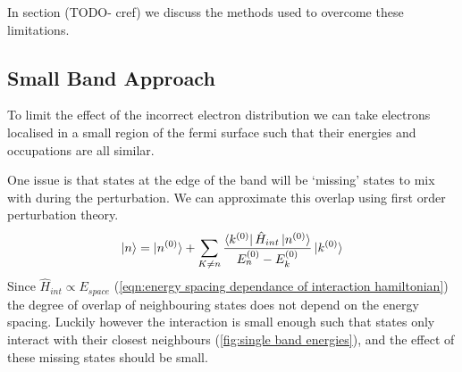 In section (TODO- cref) we discuss the methods
used to overcome these limitations.

\subsection{Small Band Approach}\label{sec:small band approach}
To limit the effect of the incorrect
electron distribution we can
take electrons localised
in a small region of the fermi
surface such that their energies
and occupations are all similar.

One issue is that states at the edge
of the band will be `missing'
states to mix with during the
perturbation. We can approximate
this overlap using first order perturbation theory.
\begin{equation}
    \ket{n} = \ket{n^{(0)}} + \sum_{K\neq{}n} \frac{\bra{k^{(0)}} \hat{H}_{int} \ket{n^{(0)}}}{E_n^{(0)} - E_k^{(0)}} \ket{k^{(0)}}
\end{equation}
Since \(\hat{H}_{int} \propto E_{space}\)
(\cref{eqn:energy spacing dependance of interaction hamiltonian})
the degree of overlap of neighbouring states does
not depend on the energy spacing. Luckily
however the interaction is small
enough such that states only interact with
their closest neighbours (\cref{fig:single band energies}),
and the effect of these missing states should be small.
